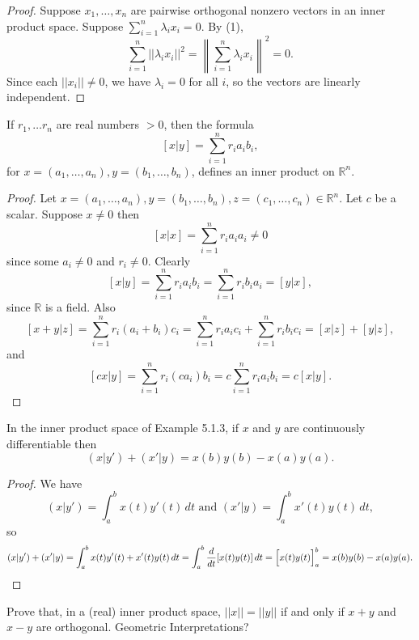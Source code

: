 \begin{proof}
    Suppose $x_1, \ldots, x_n$ are pairwise orthogonal nonzero vectors in an inner product space.
    Suppose $\sum_{i=1}^{n} \lambda_i x_i = 0$. By (1),
    \[\sum_{i = 1}^{n} ||\lambda_i x_i||^2 = \left\|\sum_{i = 1}^{n} \lambda_i x_i\right\|^2 = 0.\]
    Since each $||x_i|| \ne 0$, we have $\lambda_i = 0$ for all $i$, so the vectors are linearly independent.
\end{proof}


\begin{tcolorbox}[title=Problem 6, breakable]
    If $r_1, \ldots r_n$ are real numbers $>0$, then the formula 
    \[[x|y] = \sum_{i = 1}^{n} r_i a_i b_i,\]
    for $x = (a_1, \ldots, a_n), y = (b_1, \ldots, b_n)$, defines an inner 
    product on $\mathbb{R}^n$.
\end{tcolorbox}

\begin{proof}
    Let $x = (a_1, \ldots, a_n), y = (b_1, \ldots, b_n), z = (c_1, \ldots, c_n) \in \mathbb{R}^n$.
    Let $c$ be a scalar.
    Suppose $x \ne 0$ then 
    \[[x|x] = \sum_{i = 1}^{n} r_i a_i a_i \ne 0\]
    since some $a_i \ne 0$ and $r_i \ne 0$.
    Clearly 
    \[[x|y] = \sum_{i = 1}^{n} r_i a_i b_i = \sum_{i = 1}^{n} r_i b_i a_i = [y|x],\]
    since $\mathbb{R}$ is a field.
    Also 
    \[[x + y|z] = \sum_{i=1}^{n} r_i (a_i + b_i) c_i = \sum_{i=1}^{n} r_i a_i c_i + \sum_{i=1}^{n} r_i b_i c_i = [x|z] + [y|z],\]
    and 
    \[[cx|y] = \sum_{i=1}^{n} r_i (c a_i) b_i = c \sum_{i=1}^{n} r_i a_i b_i = c[x|y].\]
\end{proof}

\begin{tcolorbox}[title=Problem 7, breakable]
    In the inner product space of Example 5.1.3, if $x$ and $y$ are continuously 
    differentiable then 
    \[(x|y') + (x'|y) = x(b)y(b) - x(a)y(a).\]
\end{tcolorbox}

\begin{proof}
    We have 
    \[(x|y') = \int_{a}^{b} x(t) y'(t) \, dt \text{ and } (x'|y) = \int_{a}^{b} x'(t) y(t) \, dt,\]
    so 
    \[(x|y') + (x'|y) = \int_{a}^{b} x(t) y'(t) + x'(t) y(t) \, dt = \int_{a}^{b} \frac{d}{dt}[x(t)y(t)] \, dt = \Big[x(t)y(t)\Big]_{a}^{b} = x(b)y(b) - x(a)y(a). \qedhere\]
\end{proof}


\begin{tcolorbox}[title=Problem 8, breakable]
    Prove that, in a (real) inner product space, $||x|| = ||y||$ if and only if 
    $x + y$ and $x - y$ are orthogonal. Geometric Interpretations?
\end{tcolorbox}


